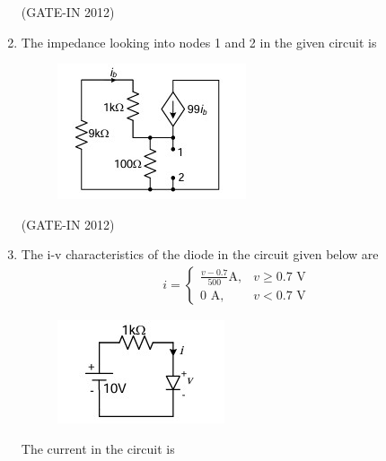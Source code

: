 \documentclass[journal,12pt,onecolumn]{IEEEtran}
\theoremstyle{remark}
\begin{document}
\begin{enumerate}
\hfill{(GATE-IN 2012)}
\begin{enumerate}
\end{enumerate}

\item The impedance looking into nodes 1 and 2 in the given circuit is
\begin{figure}[H]
    \centering
    \includegraphics[width=0.4\columnwidth]{figs/a3.jpg}
    \caption*{}
    \label{fig:a3}
\end{figure}

\hfill{(GATE-IN 2012)}
\begin{enumerate}
\end{enumerate}

\item The i-v characteristics of the diode in the circuit given below are
\begin{align*} 
i = \begin{cases} \frac{v-0.7}{500} \text{A}, & v \geq 0.7 \text{ V} \\ 0 \text{ A}, & v < 0.7 \text{ V} \end{cases}
\end{align*}
\begin{figure}[H]
    \centering
    \includegraphics[width=0.4\columnwidth]{figs/a4.jpg}
    \caption*{}
    \label{fig:a4}
\end{figure}
The current in the circuit is


\end{enumerate}
\end{document}
